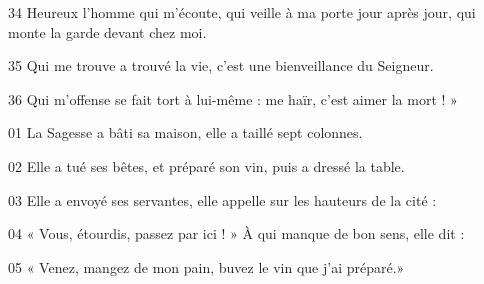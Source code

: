 34 Heureux l’homme qui m’écoute, qui veille à ma porte jour après jour, qui monte la garde devant chez moi.

35 Qui me trouve a trouvé la vie, c’est une bienveillance du Seigneur.

36 Qui m’offense se fait tort à lui-même : me haïr, c’est aimer la mort ! »

01 La Sagesse a bâti sa maison, elle a taillé sept colonnes.

02 Elle a tué ses bêtes, et préparé son vin, puis a dressé la table.

03 Elle a envoyé ses servantes, elle appelle sur les hauteurs de la cité :

04 « Vous, étourdis, passez par ici ! » À qui manque de bon sens, elle dit :

05 « Venez, mangez de mon pain, buvez le vin que j’ai préparé.»